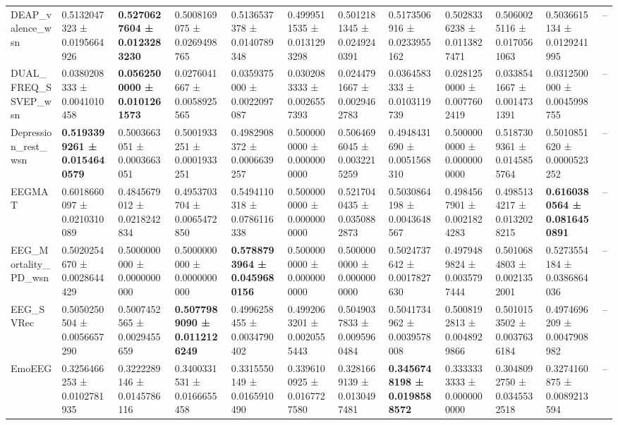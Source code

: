 \begin{table}[htbp]
\begin{tabular}{llllllllllll}
DEAP_valence_wsn & 0.5132047323 ± 0.0195664926 & \bfseries 0.5270627604 ± 0.0123283230 & 0.5008169075 ± 0.0269498765 & 0.5136537378 ± 0.0140789348 & 0.4999511535 ± 0.0131293298 & 0.5012181345 ± 0.0249240391 & 0.5173506916 ± 0.0233955162 & 0.5028336238 ± 0.0113827471 & 0.5060025116 ± 0.0170561063 & 0.5036615134 ± 0.0129241995 & -- \\
DUAL_FREQ_SSVEP_wsn & 0.0380208333 ± 0.0041010458 & \bfseries 0.0562500000 ± 0.0101261573 & 0.0276041667 ± 0.0058925565 & 0.0359375000 ± 0.0022097087 & 0.0302083333 ± 0.0026557393 & 0.0244791667 ± 0.0029462783 & 0.0364583333 ± 0.0103119739 & 0.0281250000 ± 0.0077602419 & 0.0338541667 ± 0.0014731391 & 0.0312500000 ± 0.0045998755 & -- \\
Depression_rest_wsn & \bfseries 0.5193399261 ± 0.0154640579 & 0.5003663051 ± 0.0003663051 & 0.5001933251 ± 0.0001933251 & 0.4982908372 ± 0.0006639257 & 0.5000000000 ± 0.0000000000 & 0.5064696045 ± 0.0032215259 & 0.4948431690 ± 0.0051568310 & 0.5000000000 ± 0.0000000000 & 0.5187309361 ± 0.0145855764 & 0.5010851620 ± 0.0000523252 & -- \\
EEGMAT & 0.6018660097 ± 0.0210310089 & 0.4845679012 ± 0.0218242834 & 0.4953703704 ± 0.0065472850 & 0.5494110318 ± 0.0786116338 & 0.5000000000 ± 0.0000000000 & 0.5217040435 ± 0.0350882873 & 0.5030864198 ± 0.0043648567 & 0.4984567901 ± 0.0021824283 & 0.4985134217 ± 0.0132028215 & \bfseries 0.6160380564 ± 0.0816450891 & -- \\
EEG_Mortality_PD_wsn & 0.5020254670 ± 0.0028644429 & 0.5000000000 ± 0.0000000000 & 0.5000000000 ± 0.0000000000 & \bfseries 0.5788793964 ± 0.0459680156 & 0.5000000000 ± 0.0000000000 & 0.5000000000 ± 0.0000000000 & 0.5024737642 ± 0.0017827630 & 0.4979489824 ± 0.0035797444 & 0.5010684803 ± 0.0021352001 & 0.5273554184 ± 0.0386864036 & -- \\
EEG_SVRec & 0.5050250504 ± 0.0056657290 & 0.5007452565 ± 0.0029455659 & \bfseries 0.5077989090 ± 0.0112126249 & 0.4996258455 ± 0.0034790402 & 0.4992063201 ± 0.0020555443 & 0.5049037833 ± 0.0095960484 & 0.5041734962 ± 0.0039578008 & 0.5008192813 ± 0.0048929866 & 0.5010153502 ± 0.0037636184 & 0.4974696209 ± 0.0047908982 & -- \\
EmoEEG & 0.3256466253 ± 0.0102781935 & 0.3222289146 ± 0.0145786116 & 0.3400331531 ± 0.0166655458 & 0.3315550149 ± 0.0165910490 & 0.3396100925 ± 0.0167727580 & 0.3281669139 ± 0.0130497481 & \bfseries 0.3456748198 ± 0.0198588572 & 0.3333333333 ± 0.0000000000 & 0.3048092750 ± 0.0345532518 & 0.3274160875 ± 0.0089213594 & -- \\

\end{tabular}
\end{table}
